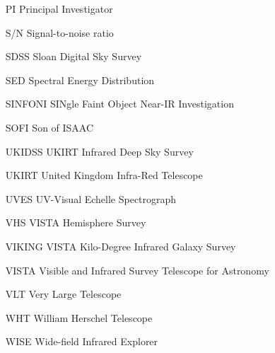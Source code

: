 \begin{itemize}
      \item[PI]{Principal Investigator}
      \item[S/N]{Signal-to-noise ratio}  
      \item[SDSS]{Sloan Digital Sky Survey}
      \item[SED]{Spectral Energy Distribution}
      \item[SINFONI]{SINgle Faint Object Near-IR Investigation}
      \item[SOFI]{Son of ISAAC} 
      \item[UKIDSS]{UKIRT Infrared Deep Sky Survey}
      \item[UKIRT]{United Kingdom Infra-Red Telescope}
      \item[UVES]{UV-Visual Echelle Spectrograph}
      \item[VHS]{VISTA Hemisphere Survey}
      \item[VIKING]{VISTA Kilo-Degree Infrared Galaxy Survey}
      \item[VISTA]{Visible and Infrared Survey Telescope for Astronomy}
      \item[VLT]{Very Large Telescope} 
      \item[WHT]{William Herschel Telescope}
      \item[WISE]{Wide-field Infrared Explorer}
    \end{itemize}     

          
\endgroup


